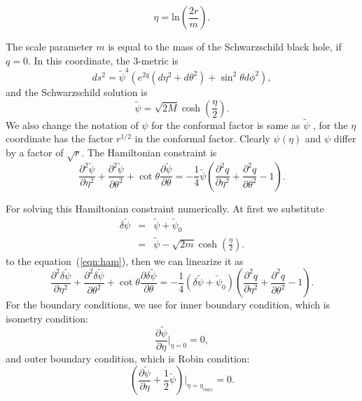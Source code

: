 \documentclass{article}
\begin{document}
\begin{equation}
\label{eta_coord}
\eta = \mbox{ln} (\frac{2r}{m}).
\end{equation}

The scale parameter $m$ is equal to the mass of the Schwarzschild
black hole, if $q=0$.  In this coordinate, the 3-metric is
\begin{equation}
\label{eqn:metric_brill_eta}
ds^2 = \tilde{\psi}^4 (e^{2q} (d\eta^2+d\theta^2)+\sin^2 \theta
d\phi^2),
\end{equation}
and the Schwarzschild solution is 
\begin{equation}
\label{eqn:psi}
\tilde{\psi} = \sqrt{2M} \cosh (\frac{\eta}{2}).
\end{equation}
We also change the notation of $\psi$ for the conformal factor is same 
as $\tilde{\psi}$ \cite{Camarda97a}, for the $\eta$ coordinate has the
factor $r^{1/2}$ in the conformal factor.  Clearly $\psi(\eta)$ and
$\psi$ differ by a factor of $\sqrt{r}$.  The Hamiltonian 
constraint is
\begin{equation}
\label{eqn:ham}
\frac{\partial^2 \tilde{\psi}}{\partial \eta^2} + \frac{\partial^2
  \tilde{\psi}}{\partial \theta^2} + \cot \theta \frac{\partial
  \tilde{\psi}}{\partial \theta} = - \frac{1}{4} \tilde{\psi}
(\frac{\partial^2 q}{\partial \eta^2} + \frac{\partial^2 q}{\partial
  \theta^2} -1).
\end{equation}

For solving this Hamiltonian constraint numerically.  At first
we substitute
\begin{eqnarray}
\delta \tilde{\psi} & = & \tilde{\psi}+\tilde{\psi}_0 \\
                    & = & \tilde{\psi}-\sqrt{2m} \cosh(\frac{\eta}{2}).
\end{eqnarray}
to the equation~(\ref{eqn:ham}), then we can linearize it as
\begin{equation}
\frac{\partial^2 \delta\tilde{\psi}}{\partial \eta^2} + \frac{\partial^2
  \delta\tilde{\psi}}{\partial \theta^2} + \cot \theta \frac{\partial
  \delta\tilde{\psi}}{\partial \theta} = - \frac{1}{4}
(\delta\tilde{\psi} + \tilde{\psi}_0) (\frac{\partial^2 q}{\partial
  \eta^2} + \frac{\partial^2 q}{\partial \theta^2} -1).
\label{eqn:ham_linear}
\end{equation}
For the boundary conditions, we use for inner boundary condition,
which is isometry condition:
\begin{equation}
\frac{\partial \tilde{\psi}}{\partial \eta}|_{\eta = 0} = 0,
\end{equation}
and outer boundary condition, which is Robin condition:
\begin{equation}
(\frac{\partial \tilde{\psi}}{\partial \eta} + \frac{1}{2}
\tilde{\psi})|_{\eta=\eta_{max}} = 0.
\end{equation}
\end{document}
